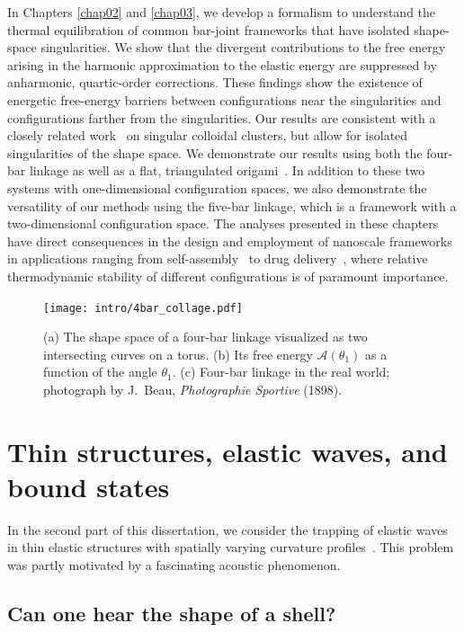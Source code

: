 In Chapters \ref{chap02} and \ref{chap03}, we develop a formalism to understand the thermal equilibration of common bar-joint frameworks that have isolated shape-space singularities.
We show that the divergent contributions to the free energy arising in the harmonic approximation to the elastic energy are suppressed by anharmonic, quartic-order corrections.
These findings show the existence of energetic free-energy barriers between configurations near the singularities and configurations farther from the singularities.
Our results are consistent with a closely related work~\cite{kallus2017,holmes-cerfon2017} on singular colloidal clusters, but allow for isolated singularities of the shape space.
We demonstrate our results using both the four-bar linkage as well as a flat, triangulated origami~\cite{chen2018}.
In addition to these two systems with one-dimensional configuration spaces, we also demonstrate the versatility of our methods using the five-bar linkage, which is a framework with a two-dimensional configuration space.
The analyses presented in these chapters have direct consequences in the design and employment of nanoscale frameworks in applications ranging from self-assembly~\cite{liedl2010} to drug delivery~\cite{zhao2019}, where relative thermodynamic stability of different configurations is of paramount importance.
%
\begin{figure}
  \begin{center}
    \texttt{[image: intro/4bar\_collage.pdf]}
  \end{center}
\caption{(a) The shape space of a four-bar linkage visualized as two intersecting curves on a torus. (b) Its free energy $\mathscr{A}(\theta_{1})$ as a function of the angle $\theta_{1}$. (c) Four-bar linkage in the real world; photograph by J.~Beau, \emph{Photographie Sportive} (1898).}
  \label{fig:4bar_collage}
\end{figure}

\section{Thin structures, elastic waves, and bound states}

In the second part of this dissertation, we consider the trapping of elastic waves in thin elastic structures with spatially varying curvature profiles~\cite{mannattil2023}.
This problem was partly motivated by a fascinating acoustic phenomenon.

\subsection{Can one hear the shape of a shell?}

